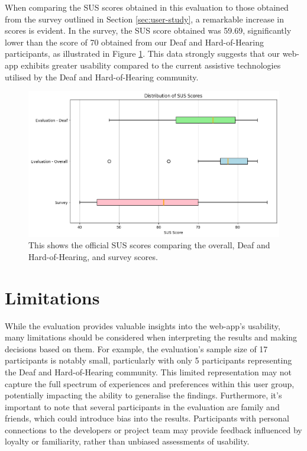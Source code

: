 \documentclass{l4proj}
\begin{document}
When comparing the SUS scores obtained in this evaluation to those obtained from the survey outlined in Section \ref{sec:user-study}, a remarkable increase in scores is evident. In the survey, the SUS score obtained was 59.69, significantly lower than the score of 70 obtained from our Deaf and Hard-of-Hearing participants, as illustrated in Figure \ref{fig:comp-SUS}. This data strongly suggests that our web-app exhibits greater usability compared to the current assistive technologies utilised by the Deaf and Hard-of-Hearing community. 

\begin{figure}
    \centering
    \includegraphics[width=0.75\linewidth]{dissertation/images/ActualSUS.png}    
    \caption{This shows the official SUS scores comparing the overall, Deaf and Hard-of-Hearing, and survey scores.}
    \label{fig:comp-SUS} 
\end{figure}

\section{Limitations}

While the evaluation provides valuable insights into the web-app's usability, many limitations should be considered when interpreting the results and making decisions based on them. For example, the evaluation's sample size of 17 participants is notably small, particularly with only 5 participants representing the Deaf and Hard-of-Hearing community. This limited representation may not capture the full spectrum of experiences and preferences within this user group, potentially impacting the ability to generalise the findings. Furthermore, it's important to note that several participants in the evaluation are family and friends, which could introduce bias into the results. Participants with personal connections to the developers or project team may provide feedback influenced by loyalty or familiarity, rather than unbiased assessments of usability.
\end{document}
